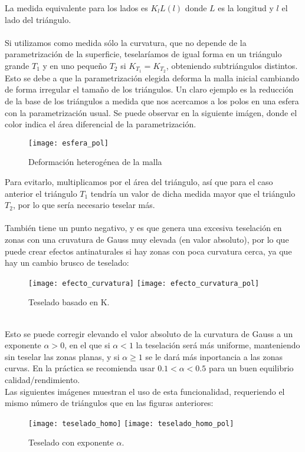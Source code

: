 	La medida equivalente para los lados es $K_l L(l)$ donde $L$ es la longitud y $l$ el lado del triángulo.\\
	\\Si utilizamos como medida sólo la curvatura, que no depende de la parametrización de la superficie, teselaríamos de igual forma en un triángulo grande $T_1$ y en uno pequeño $T_2$ si $K_{T_1}=K_{T_2}$, obteniendo subtriángulos distintos. Esto se debe a que la parametrización elegida deforma la malla inicial cambiando de forma irregular el tamaño de los triángulos. Un claro ejemplo es la reducción de la base de los triángulos a medida que nos acercamos a los polos en una esfera con la parametrización usual. Se puede observar en la siguiente imágen, donde el color indica el área diferencial de la parametrización.\\
	\begin{figure}[h]
  		\centering
  		\texttt{[image: esfera\_pol]}
  		\caption{Deformación heterogénea de la malla}
  		\label{fig:esfera_pol}
	\end{figure}
	\newpage
	Para evitarlo, multiplicamos por el área del triángulo, así que para el caso anterior el triángulo $T_1$ tendría un valor de dicha medida mayor que el triángulo $T_2$, por lo que sería necesario teselar más.\\
	\\También tiene un punto negativo, y es que genera una excesiva teselación en zonas con una cruvatura de Gauss muy elevada (en valor absoluto), por lo que puede crear efectos antinaturales si hay zonas con poca curvatura cerca, ya que hay un cambio brusco de teselado:\\
	\begin{figure}[h]
  		\centering
  		\texttt{[image: efecto\_curvatura]}
  		\texttt{[image: efecto\_curvatura\_pol]}
		\caption{Teselado basado en K.}
  		\label{fig:efecto_curvatura}
	\end{figure}
\\Esto se puede corregir elevando el valor absoluto de la curvatura de Gauss a un exponente $\alpha>0$, en el que si $\alpha<1$ la teselación será más uniforme, manteniendo sin teselar las zonas planas, y si $\alpha\geq1$ se le dará más inportancia a las zonas curvas. En la práctica se recomienda usar $0.1<\alpha<0.5$ para un buen equilibrio calidad/rendimiento.\\

\newpage
Las siguientes imágenes muestran el uso de esta funcionalidad, requeriendo el mismo número de triángulos que en las figuras anteriores:
	\begin{figure}[h]
  		\centering
  		\texttt{[image: teselado\_homo]}
  		\texttt{[image: teselado\_homo\_pol]}
		\caption{Teselado con exponente $\alpha$.}
  		\label{fig:teselado_homo}
	\end{figure}

